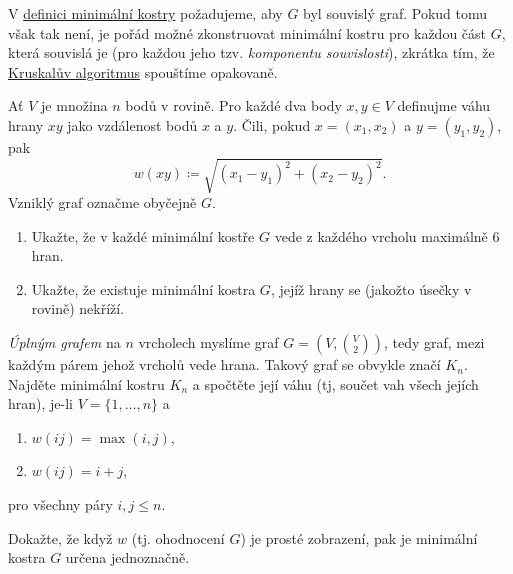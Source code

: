 \begin{remark}
 V \hyperref[def:minimalni-kostra]{definici minimální kostry} požadujeme, aby
 $G$ byl souvislý graf. Pokud tomu však tak není, je pořád možné zkonstruovat
 minimální kostru pro každou část $G$, která souvislá je (pro každou jeho tzv.
 \emph{komponentu souvislosti}), zkrátka tím, že
 \hyperref[alg:kruskal]{Kruskalův algoritmus} spouštíme opakovaně.
\end{remark}

\begin{exercise}
 Ať $V$ je množina $n$ bodů v rovině. Pro každé dva body $x,y \in V$ definujme
 váhu hrany $xy$ jako vzdálenost bodů $x$ a $y$. Čili, pokud $x = (x_1,x_2)$ a
 $y = (y_1,y_2)$, pak
 \[
  w(xy) \coloneqq \sqrt{(x_1 - y_1)^2 + (x_2 - y_2)^2}.
 \]
 Vzniklý graf označme obyčejně $G$.
 \begin{enumerate}[label=(\alph*)]
  \item Ukažte, že v každé minimální kostře $G$ vede z každého vrcholu maximálně
   6 hran.
  \item Ukažte, že existuje minimální kostra $G$, jejíž hrany se (jakožto úsečky
   v rovině) nekříží.
 \end{enumerate}
\end{exercise}

\begin{exercise}
 \emph{Úplným grafem} na $n$ vrcholech myslíme graf $G = (V, \binom{V}{2})$,
 tedy graf, mezi každým párem jehož vrcholů vede hrana. Takový graf se obvykle
 značí $K_n$. Najděte minimální kostru $K_n$ a spočtěte její váhu (tj, součet
 vah všech jejích hran), je-li $V = \{1,\ldots,n\}$ a
 \begin{enumerate}[label=(\alph*)]
  \item $w(ij) = \max(i,j)$,
  \item $w(ij) = i + j$,
 \end{enumerate}
 pro všechny páry $i,j \leq n$.
\end{exercise}

\begin{exercise}
 Dokažte, že když $w$ (tj. ohodnocení $G$) je prosté zobrazení, pak je minimální
 kostra $G$ určena jednoznačně.
\end{exercise}
